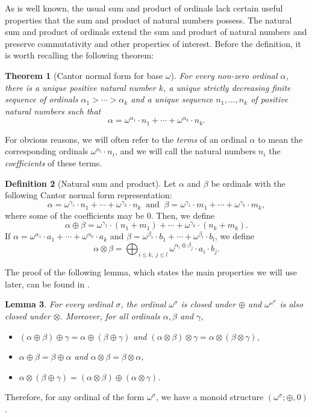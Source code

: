 \documentclass[reqno]{amsart}
\newtheorem{theorem}{Theorem}[section]
\newtheorem{lemma}[theorem]{Lemma}
\theoremstyle{definition}
\theoremstyle{definition}
\newtheorem{definition}[theorem]{Definition}
\theoremstyle{plain} %
\begin{document}
As is well known, the usual sum and product of ordinals lack certain useful properties that the sum and product of natural numbers possess. The natural sum and product of ordinals extend the sum and product of natural numbers and preserve commutativity and other properties of interest. Before the definition, it is worth recalling the following theorem:
\begin{theorem}[Cantor normal form for base $\omega$] For every non-zero ordinal $\alpha$, there is a unique positive natural number $k$, a unique strictly decreasing finite sequence of ordinals $\alpha_1>\cdots>\alpha_k$ and a unique sequence $n_1, \dots , n_k$ of positive natural numbers such that $$ \alpha=\omega^{\alpha_1}\cdot n_1+\cdots+\omega^{\alpha_k}\cdot n_k.$$
\end{theorem}
For obvious reasons, we will often refer to the \textit{terms} of an ordinal $\alpha$ to mean the corresponding ordinals $\omega^{\alpha_i}\cdot n_i$, and we will call the natural numbers $n_i$ the \textit{coefficients} of these terms.

\begin{definition}[Natural sum and product]
    Let $\alpha$ and $\beta$ be ordinals with the following Cantor normal form representation: $$\alpha=\omega^{\gamma_1}\cdot n_1+\cdots+\omega^{\gamma_k}\cdot n_k \ \text{ and } \ \beta=\omega^{\gamma_1}\cdot m_1+\cdots+\omega^{\gamma_k}\cdot m_k,$$ where some of the coefficients may be 0. Then, we define $$\alpha\oplus\beta=\omega^{\gamma_1}\cdot(n_1+m_1)+\cdots+\omega^{\gamma_k}\cdot(n_k+m_k).$$ If $\alpha=\omega^{\alpha_1}\cdot a_1+\cdots+\omega^{\alpha_k}\cdot a_k$ and $\beta=\omega^{\beta_1}\cdot b_1+\cdots+\omega^{\beta_l}\cdot b_l$, we define $$\alpha\otimes\beta=\bigoplus_{i\leq k, \ j\leq l}\omega^{\alpha_i\oplus\beta_j}\cdot a_i\cdot b_j.$$
\end{definition}
The proof of the following lemma, which states the main properties we will use later, can be found in \cite[Lemma 3.3]{DEJONGH1977195}. 
\begin{lemma}\label{lemamon}
    For every ordinal $\sigma$, the ordinal $\omega^\sigma$ is closed under $\oplus$ and $\omega^{\omega^\sigma}$ is also closed under $\otimes$. Moreover, for all ordinals $\alpha,\beta$ and $\gamma$,\begin{itemize}
    \item $(\alpha\oplus\beta)\oplus\gamma=\alpha\oplus(\beta\oplus\gamma)$ and $(\alpha\otimes\beta)\otimes\gamma=\alpha\otimes(\beta\otimes\gamma)$,
    \item $ \alpha\oplus\beta=\beta\oplus\alpha$ and $\alpha\otimes\beta=\beta\otimes\alpha$,
    \item $\alpha\otimes(\beta\oplus\gamma)=(\alpha\otimes\beta)\oplus(\alpha\otimes\gamma)$.
    \end{itemize}
\end{lemma}
Therefore, for any ordinal of the form $\omega^\sigma$, we have a monoid structure $(\omega^\sigma; \oplus, 0)$.
\end{document}
